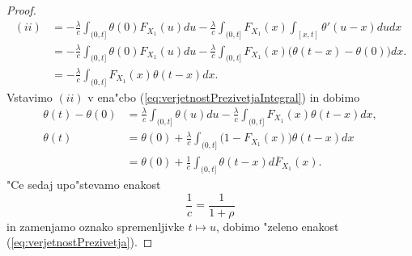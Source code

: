 \documentclass[12pt, a4paper, reqno]{amsart}
\theoremstyle{definition}
\theoremstyle{plain}
\newcommand{\1}{\mathds{1}}
\begin{document}
\begin{proof}
        \begin{align*}
            (ii)    &=  - \frac{\lambda}{c}\int_{(0, t]}\theta(0)F_{X_1}(u)du - \frac{\lambda}{c}\int_{(0, t]}F_{X_1}(x)\int_{[x, t]}\theta'(u - x)dudx \\
                    &= - \frac{\lambda}{c}\int_{(0, t]}\theta(0)F_{X_1}(u)du - \frac{\lambda}{c}\int_{(0, t]}F_{X_1}(x)\bigl(\theta(t-x) - \theta(0)\bigr)dx.\\
                    &= - \frac{\lambda}{c}\int_{(0, t]}F_{X_1}(x)\theta(t - x)dx.
        \end{align*}
        Vstavimo $(ii)$ v ena"cbo (\ref{eq:verjetnostPrezivetjaIntegral}) in dobimo
        \begin{align*}
            \theta(t) - \theta(0) &= \frac{\lambda}{c}\int_{(0, t]}\theta(u)du - \frac{\lambda}{c}\int_{(0, t]}F_{X_1}(x)\theta(t - x)dx,\\
            \theta(t) &= \theta(0) + \frac{\lambda}{c}\int_{(0, t]}\bigl(1 - F_{X_1}(x)\bigr)\theta(t - x)dx \\
                    &= \theta(0) + \frac{1}{c}\int_{(0, t]}\theta(t - x)d\overline{F}_{X_1}(x).
        \end{align*}
        "Ce sedaj upo"stevamo enakost 
        \begin{equation*}
            \frac{1}{c} = \frac{1}{1 + \rho}
        \end{equation*}
        in zamenjamo oznako spremenljivke $t\mapsto u$, dobimo "zeleno enakost (\ref{eq:verjetnostPrezivetja}).

    \end{proof}
\end{document}
